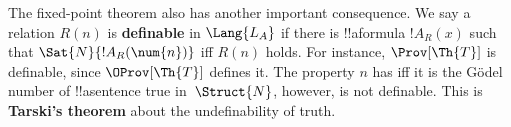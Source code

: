 The fixed-point theorem also has another important consequence. We say
a relation $R(n)$ is \textbf{definable} in $\Lang{L_A}$ if there is
!!a{formula} $!A_R(x)$ such that $\Sat{N}{!A_R(\num{n})}$ iff $R(n)$
holds. For instance, $\Prov[\Th{T}]$ is definable, since
$\OProv[\Th{T}]$ defines it. The property $n$ has iff it is the
G\"odel number of !!a{sentence} true in~$\Struct{N}$, however, is not
definable. This is \textbf{Tarski's theorem} about the undefinability
of truth.
